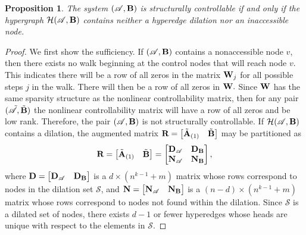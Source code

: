 \documentclass[journal,twoside,web]{ieeecolor}
\newtheorem{proposition}{Proposition}
\newcommand{\Hs}{\mathcal{H}}
\newcommand{\Ss}{\mathcal{S}}
\begin{document}
\begin{proposition}\label{thm: structural control of polynomials}
   The system $(\mathscr A,\textbf B)$ is structurally controllable if and only if the hypergraph $\Hs(\mathscr A,\textbf B)$ contains neither a hyperedge dilation nor an inaccessible node.
\end{proposition}


\begin{proof}
    We first show the sufficiency.
    If $(\mathscr A,\textbf B)$ contains a nonaccessible node $v$, then there exists no walk beginning at the control nodes that will reach node $v$.
    This indicates there will be a row of all zeros in the matrix $\textbf W_j$ for all possible steps $j$ in the walk.
    There will then be a row of all zeros in $\textbf W.$
    Since $\textbf W$ has the same sparsity structure as the nonlinear controllability matrix, then for any pair $(\tilde{\mathscr A},\tilde{\textbf B})$ the nonlinear controllability matrix will have a row of all zeros and be low rank.
    Therefore, the pair $(\mathscr A,\textbf B)$ is not structurally controllable.
If $\Hs(\mathscr A,\textbf B)$ contains a dilation, the augmented matrix $\textbf R=\begin{bmatrix}
        \tilde{\textbf A}_{(1)}&\tilde{\textbf B}
    \end{bmatrix}$ may be partitioned as
    \begin{equation*}
        \textbf R=\begin{bmatrix}
            \tilde{\textbf A}_{(1)}&\tilde{\textbf B}    \end{bmatrix}=\begin{bmatrix}
            \textbf D_\mathscr A&\textbf D_{\textbf B}\\ \textbf N_\mathscr A&\textbf N_\textbf B
        \end{bmatrix},
    \end{equation*}
    where $\textbf D=\begin{bmatrix}
        \textbf D_\mathscr A&\textbf D_\textbf B
    \end{bmatrix}$ is a $d\times (n^{k-1}+m)$ matrix whose rows correspond to nodes in the dilation set $\Ss$, and $\textbf N=\begin{bmatrix}
        \textbf N_\mathscr A&\textbf N_\textbf B
    \end{bmatrix}$ is a $(n-d)\times (n^{k-1}+m)$ matrix whose rows correspond to nodes not found within the dilation.
    Since $\Ss$ is a dilated set of nodes, there exists $d-1$ or fewer hyperedges whose heads are unique with respect to the elements in $\Ss.$

\end{proof}
\end{document}
